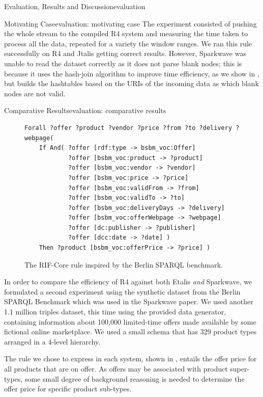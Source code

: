 \begin{nestedsection}{Evaluation, Results and Discussion}{evaluation}
\begin{nestedsection}{Motivating Case}{evaluation: motivating case}
		The experiment consisted of pushing the whole stream to the compiled R4 system and measuring the time taken to process all the data, repeated for a variety the window ranges.
		We ran this rule successfully on R4 and Jtalis getting correct results.
		However, Sparkwave was unable to read the dataset correctly as it does not parse blank nodes;
		this is because it uses the hash-join algorithm to improve time efficiency, as we show in , but builds the hashtables based on the URIs of the incoming data as which blank nodes are not valid.
	\end{nestedsection}
	\begin{nestedsection}{Comparative Results}{evaluation: comparative results}
		\begin{figure}[t]
			\centering
			\begin{verbatim}
Forall ?offer ?product ?vendor ?price ?from ?to ?delivery ?webpage(
    If And( ?offer [rdf:type -> bsbm_voc:Offer]
            ?offer [bsbm_voc:product -> ?product]
            ?offer [bsbm_voc:vendor -> ?vendor]
            ?offer [bsbm_voc:price -> ?price]
            ?offer [bsbm_voc:validFrom -> ?from]
            ?offer [bsbm_voc:validTo -> ?to]
            ?offer [bsbm_voc:deliveryDays -> ?delivery]
            ?offer [bsbm_voc:offerWebpage -> ?webpage]
            ?offer [dc:publisher -> ?publisher]
            ?offer [dcc:date -> ?date] )
    Then ?product [bsbm_voc:offerPrice -> ?price] )
			\end{verbatim}
			\caption{The RIF-Core rule inspired by the Berlin SPARQL benchmark.}
		\end{figure}

		In order to compare the efficiency of R4 against both Etalis \emph{and} Sparkwave, we formulated a second experiment using the synthetic dataset from the Berlin SPARQL Benchmark \citep{BSBMresults} which was used in the Sparkwave paper.
		We used another 1.1 million triples dataset, this time using the provided data generator, containing information about 100,000 limited-time offers made available by some fictional online marketplace.
		We used a small schema that has 329 product types arranged in a 4-level hierarchy.

		The rule we chose to express in each system, shown in , entails the offer price for all products that are on offer.
		As offers may be associated with product super-types, some small degree of background reasoning is needed to determine the offer price for specific product sub-types.


\end{nestedsection}
\end{nestedsection}
